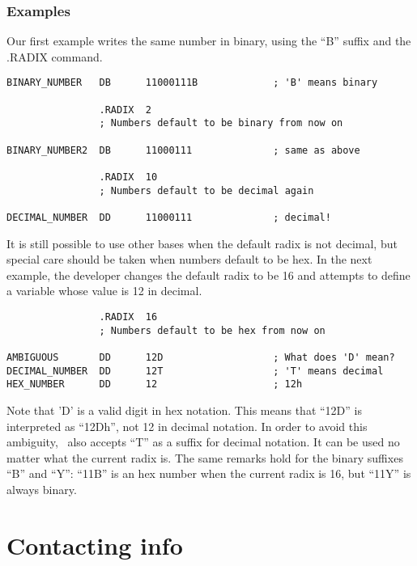 \documentclass[a4paper,draft,12pt]{book}
\begin{document}
\subsection{Examples}

Our first example writes the same number in binary, using the ``B'' suffix
and the .RADIX command.

\begin{verbatim}
BINARY_NUMBER   DB      11000111B             ; 'B' means binary

                .RADIX  2
                ; Numbers default to be binary from now on

BINARY_NUMBER2  DB      11000111              ; same as above

                .RADIX  10
                ; Numbers default to be decimal again

DECIMAL_NUMBER  DD      11000111              ; decimal!
\end{verbatim}

It is still possible to use other bases when the default radix is not
decimal, but special care should be taken when numbers default to be hex.
In the next example, the developer changes the default radix to be 16
and attempts to define a variable whose value is 12 in decimal.

\begin{verbatim}
                .RADIX  16
                ; Numbers default to be hex from now on

AMBIGUOUS       DD      12D                   ; What does 'D' mean?
DECIMAL_NUMBER  DD      12T                   ; 'T' means decimal
HEX_NUMBER      DD      12                    ; 12h
\end{verbatim}

Note that 'D' is a valid digit in hex notation. This means that ``12D''
is interpreted as ``12Dh'', not 12 in decimal notation. In order to
avoid this ambiguity, \popasm\ also accepts ``T'' as a suffix for
decimal notation. It can be used no matter what the current radix is.
The same remarks hold for the binary suffixes ``B'' and ``Y'': ``11B''
is an hex number when the current radix is 16, but ``11Y'' is always
binary.

\appendix
\chapter{Contacting info\label{CONTACT}}
\end{document}

